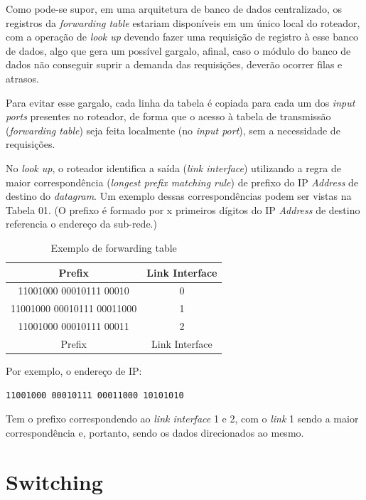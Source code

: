 Como pode-se supor, em uma arquitetura de banco de dados centralizado,
os registros da \emph{forwarding table} estariam disponíveis em um único
local do roteador, com a operação de \emph{look up} devendo fazer uma
requisição de registro à esse banco de dados, algo que gera um possível
gargalo, afinal, caso o módulo do banco de dados não conseguir suprir a
demanda das requisições, deverão ocorrer filas e atrasos.

Para evitar esse gargalo, cada linha da tabela é copiada para cada um
dos \emph{input ports} presentes no roteador, de forma que o acesso à
tabela de transmissão (\emph{forwarding table}) seja feita localmente
(no \emph{input port}), sem a necessidade de requisições.

No \emph{look up}, o roteador identifica a saída (\emph{link interface})
utilizando a regra de maior correspondência (\emph{longest prefix
matching rule}) de prefixo do IP \emph{Address} de destino do
\emph{datagram}. Um exemplo dessas correspondências podem ser vistas na
Tabela 01. (O prefixo é formado por x primeiros dígitos do IP
\emph{Address} de destino referencia o endereço da sub-rede.)


\begin{table}[h!]
\centering
\begin{tabular}{||c c||} 
 \hline
    Prefix & Link Interface \\ [0.5ex] 
 \hline\hline
    11001000 00010111 00010 & 0 \\
 \hline
    11001000 00010111 00011000 & 1 \\
 \hline
    11001000 00010111 00011 & 2 \\
 \hline
    Prefix & Link Interface \\
 \hline

\end{tabular}
\caption{Exemplo de forwarding table \\}
\label{Exemplo de forwarding table}
\end{table}




Por exemplo, o endereço de IP:

\begin{verbatim}
11001000 00010111 00011000 10101010
\end{verbatim}

Tem o prefixo correspondendo ao \emph{link interface} 1 e 2, com o
\emph{link} 1 sendo a maior correspondência e, portanto, sendo os dados
direcionados ao mesmo.

\hypertarget{switching}{%
\section{Switching}\label{switching}}

